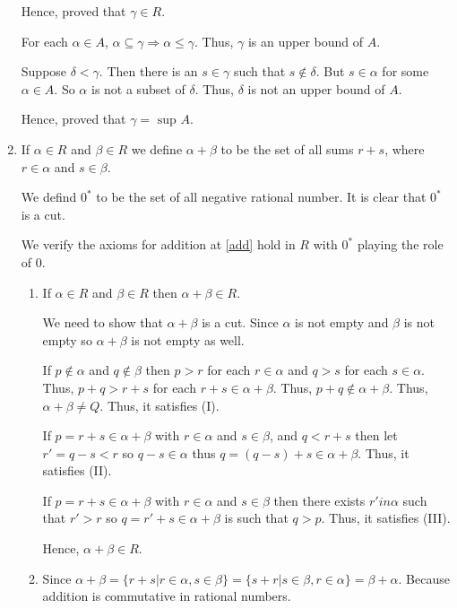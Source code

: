 \begin{enumerate}[{\bf Step 1.}]
Hence, proved that $\gamma \in R$.

For each $\alpha \in A$, $\alpha \subseteq \gamma \Rightarrow \alpha \leq \gamma$. Thus, $\gamma$ is an upper bound of $A$.

Suppose $\delta < \gamma$. Then there is an $s \in \gamma$ such that $s \notin \delta$.
But $s \in \alpha$ for some $\alpha \in A$. So $\alpha$ is not a subset of $\delta$.
Thus, $\delta$ is not an upper bound of $A$.

Hence, proved that $\gamma = \text{ sup } A$.

\item If $\alpha \in R$ and $\beta \in R$ we define $\alpha + \beta$ to be the set of all sums $r + s$,
where $r \in \alpha$ and $s \in \beta$.

We defind $0^*$ to be the set of all negative rational number.
It is clear that $0^*$ is a cut. 

We verify the axioms for addition at \ref{add} hold in $R$ with $0^*$ playing the role of $0$.

\begin{enumerate}[(\text{A}1)]
    \item If $\alpha \in R$ and $\beta \in R$ then $\alpha + \beta \in R$.
    
    We need to show that $\alpha + \beta$ is a cut. 
    Since $\alpha$ is not empty and $\beta$ is not empty so $\alpha + \beta$ is not empty as well.
    
    If $p \notin \alpha$ and $q \notin \beta$ then $p > r$ for each $r \in \alpha$ and $q > s$ for each $s \in \alpha$.
    Thus, $p + q > r + s$ for each $r + s \in \alpha + \beta$. Thus, $p + q \notin \alpha + \beta$.
    Thus, $\alpha + \beta \neq Q$. Thus, it satisfies (I).

    If $p = r + s \in \alpha + \beta$ with $r \in \alpha$ and $s \in \beta$, and $q < r + s$
    then let $r' = q - s < r$ so $q - s \in \alpha$ thus $q = (q - s) + s \in \alpha + \beta$.
    Thus, it satisfies (II).

    If $p = r + s \in \alpha + \beta$ with $r \in \alpha$ and $s \in \beta$ then there exists
    $r' in \alpha$ such that $r' > r$ so $q = r' + s \in \alpha + \beta$ is such that $q > p$. 
    Thus, it satisfies (III).

    Hence, $\alpha + \beta \in R$.

    \item Since $\alpha + \beta = \{ r + s | r \in \alpha , s \in \beta \} = \{ s + r | s \in \beta, r \in \alpha \} = \beta + \alpha$. 
    Because addition is commutative in rational numbers.
    

\end{enumerate}
\end{enumerate}

